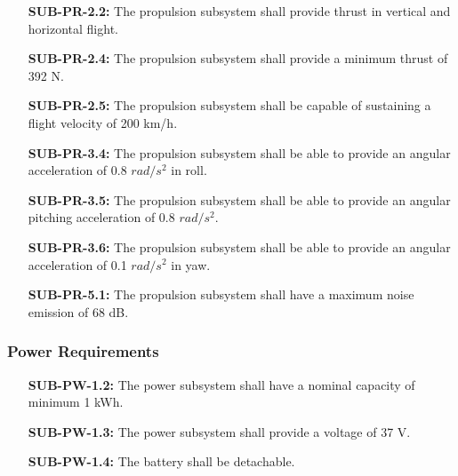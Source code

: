 \begin{enumerate}[leftmargin =3.5cm, align=parleft, labelwidth=8em]
    \item[\textbf{SUB-PR-2.2:}] The propulsion subsystem shall provide thrust in vertical and horizontal flight.
    \item[\textbf{SUB-PR-2.4:}] The propulsion subsystem shall provide a minimum thrust of 392 N.
    \item[\textbf{SUB-PR-2.5:}] The propulsion subsystem shall be capable of sustaining a flight velocity of 200 km/h.
    \item[\textbf{SUB-PR-3.4:}] The propulsion subsystem shall be able to provide an angular acceleration of 0.8 $rad/s^{2}$ in roll.
    \item[\textbf{SUB-PR-3.5:}] The propulsion subsystem shall be able to provide an angular pitching acceleration of 0.8 $rad/s^{2}$. 
    \item[\textbf{SUB-PR-3.6:}] The propulsion subsystem shall be able to provide an angular acceleration of 0.1 $rad/s^{2}$ in yaw.
    \item[\textbf{SUB-PR-5.1:}] The propulsion subsystem shall have a maximum noise emission of 68 dB.
\end{enumerate}

\subsubsection{Power Requirements}

\begin{enumerate}[leftmargin =3.5cm, align=parleft, labelwidth=8em]
    \item[\textbf{SUB-PW-1.2:}] The power subsystem shall have a nominal capacity of minimum 1 kWh. 
    \item[\textbf{SUB-PW-1.3:}] The power subsystem shall provide a voltage of 37 V.
    \item[\textbf{SUB-PW-1.4:}] The battery shall be detachable.
\end{enumerate}

